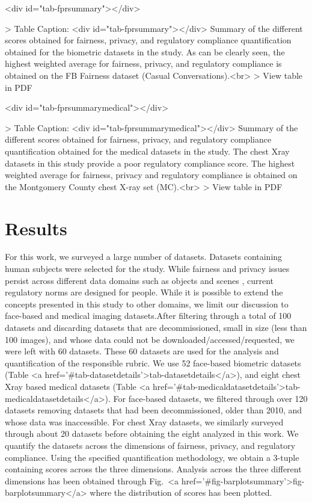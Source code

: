 \documentclass[journal]{IEEEtran}
\begin{document}
\begin{table}<div id="tab-fprsummary"></div>

> Table Caption: <div id="tab-fprsummary"></div>
Summary of the different scores obtained for fairness, privacy, and regulatory compliance quantification obtained for the biometric datasets in the study. As can be clearly seen, the highest weighted average for fairness, privacy, and regulatory compliance is obtained on the FB Fairness dataset (Casual Conversations).<br>
> View table in PDF
\end{table}

\begin{table}<div id="tab-fprsummarymedical"></div>

> Table Caption: <div id="tab-fprsummarymedical"></div>
Summary of the different scores obtained for fairness, privacy, and regulatory compliance quantification obtained for the medical datasets in the study. The chest Xray datasets in this study provide a poor regulatory compliance score. The highest weighted average for fairness, privacy and regulatory compliance is obtained on the Montgomery County chest X-ray set (MC).<br>
> View table in PDF
\end{table}


\section{Results}
For this work, we surveyed a large number of datasets. Datasets containing human subjects were selected for the study. While fairness and privacy issues persist across different data domains such as objects and scenes \cite{rojasdollar,deng2009imagenet}, current regulatory norms are designed for people. While it is possible to extend the concepts presented in this study to other domains, we limit our discussion to face-based and medical imaging datasets.After filtering through a total of 100 datasets and discarding datasets that are decommissioned, small in size (less than 100 images), and whose data could not be downloaded/accessed/requested, we were left with 60 datasets. These 60 datasets are used for the analysis and quantification of the responsible rubric. We use 52 face-based biometric datasets (Table <a href='#tab-datasetdetails'>tab-datasetdetails</a>), and eight chest Xray based medical datasets (Table <a href='#tab-medicaldatasetdetails'>tab-medicaldatasetdetails</a>). For face-based datasets, we filtered through over 120 datasets removing datasets that had been decommissioned, older than 2010, and whose data was inaccessible. For chest Xray datasets, we similarly surveyed through about 20 datasets before obtaining the eight analyzed in this work. We quantify the datasets across the dimensions of fairness, privacy, and regulatory compliance. Using the specified quantification methodology, we obtain a 3-tuple containing scores across the three dimensions. Analysis across the three different dimensions has been obtained through Fig.~<a href='#fig-barplotsummary'>fig-barplotsummary</a> where the distribution of scores has been plotted.\\
\end{document}
